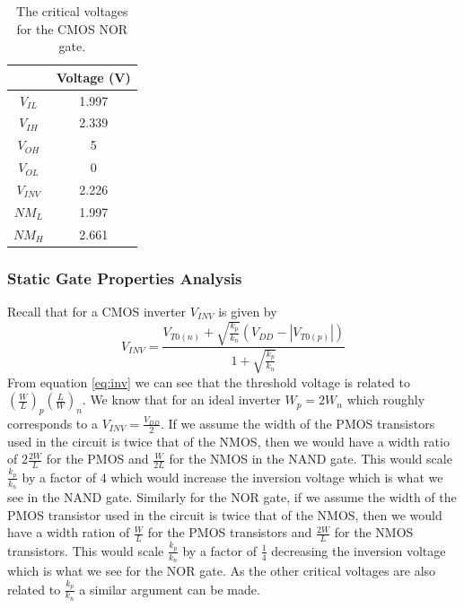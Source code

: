 \documentclass[titlepage, 12pt]{article}
\begin{document}
    \begin{table}[H]
        \centering
        \caption{The critical voltages for the CMOS NOR gate.}
        \label{tab:NOR_volt}
        \begin{tabular}{c|c}
            & Voltage (V)\\
            \hline
            $V_{IL}$ & 1.997\\
            $V_{IH}$ & 2.339\\
            $V_{OH}$ & 5\\
            $V_{OL}$ & 0\\
            $V_{INV}$ & 2.226\\
            $NM_L$ & 1.997\\
            $NM_H$ & 2.661\\
        \end{tabular}
    \end{table}

    \subsubsection{Static Gate Properties Analysis}
    Recall that for a CMOS inverter $V_{INV}$ is given by
    \begin{equation}\label{eq:inv}
        V_{INV} =
        \frac{V_{T0(n)} + \sqrt{\frac{k_p}{k_n}}(V_{DD} -|V_{T0(p)}|)}
        {1 + \sqrt{\frac{k_p}{k_n}}}
    \end{equation}
    From equation \eqref{eq:inv} we can see that the threshold voltage
    is related to
    $\left(\frac{W}{L}\right)_p\left(\frac{L}{W}\right)_n$. We know that
    for an ideal inverter $W_p = 2W_n$ which roughly corresponds to a
    $V_{INV} = \frac{V_{DD}}{2}$. If we assume the width of the
    PMOS transistors used in the circuit is twice that of the NMOS, then
    we would have a width ratio of $2\frac{2W}{L}$ for the PMOS and
    $\frac{W}{2L}$ for the NMOS in the NAND gate. This would
    scale $\frac{k_p}{k_n}$ by a factor of 4 which would increase the
    inversion voltage which is what we see in the NAND gate. Similarly
    for the NOR gate, if we assume the width of the PMOS transistor used
    in the circuit is twice that of the NMOS, then we would have a width
    ration of $\frac{W}{L}$ for the PMOS transistors and $\frac{2W}{L}$
    for the NMOS transistors. This would scale $\frac{k_p}{k_n}$ by a
    factor of $\frac{1}{4}$ decreasing the inversion voltage which is
    what we see for the NOR gate. As the other critical voltages are
    also related to $\frac{k_p}{k_n}$ a similar argument can be made.
\end{document}

